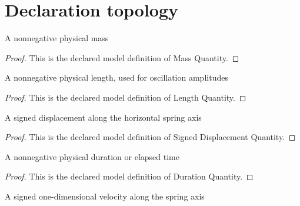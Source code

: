 \section{Declaration topology}
\begin{definition}
  \label{def:physics:phyx-mini-0261:phyxminiproblems-problemphyxmini0261-massquantity}
  A nonnegative physical mass
\end{definition}
\begin{proof}
  This is the declared model definition of Mass Quantity.
\end{proof}
\begin{definition}
  \label{def:physics:phyx-mini-0261:phyxminiproblems-problemphyxmini0261-lengthquantity}
  A nonnegative physical length, used for oscillation amplitudes
\end{definition}
\begin{proof}
  This is the declared model definition of Length Quantity.
\end{proof}
\begin{definition}
  \label{def:physics:phyx-mini-0261:phyxminiproblems-problemphyxmini0261-signeddisplacementquantity}
  A signed displacement along the horizontal spring axis
\end{definition}
\begin{proof}
  This is the declared model definition of Signed Displacement Quantity.
\end{proof}
\begin{definition}
  \label{def:physics:phyx-mini-0261:phyxminiproblems-problemphyxmini0261-durationquantity}
  A nonnegative physical duration or elapsed time
\end{definition}
\begin{proof}
  This is the declared model definition of Duration Quantity.
\end{proof}
\begin{definition}
  \label{def:physics:phyx-mini-0261:phyxminiproblems-problemphyxmini0261-signedvelocityquantity}
  A signed one-dimensional velocity along the spring axis
\end{definition}
